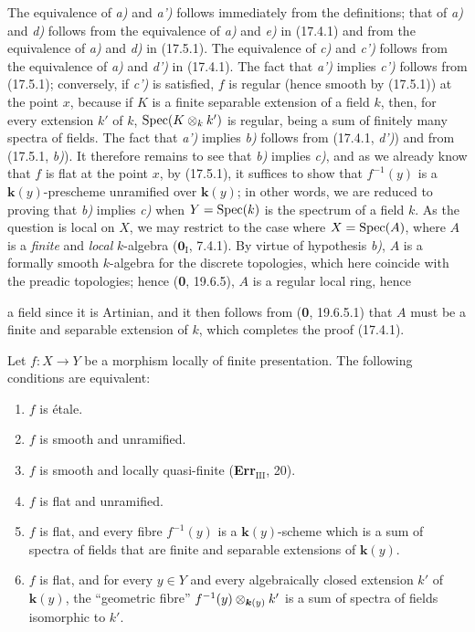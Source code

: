 The equivalence of \emph{a)} and \emph{a')} follows immediately from the definitions; that of \emph{a)} and \emph{d)} follows from the equivalence of \emph{a)} and \emph{e)} in (17.4.1) and from the equivalence of \emph{a)} and \emph{d)} in (17.5.1). The equivalence of \emph{c)} and \emph{c')} follows from the equivalence of \emph{a)} and \emph{d')} in (17.4.1). The fact that \emph{a')} implies \emph{c')} follows from (17.5.1); conversely, if \emph{c')} is satisfied, $f$ is regular (hence smooth by (17.5.1)) at the point $x$, because if $K$ is a finite separable extension of a field $k$, then, for every extension $k'$ of $k$, $\operatorname{Spec}(K\otimes_k k')$ is regular, being a sum of finitely many spectra of fields. The fact that \emph{a')} implies \emph{b)} follows from (17.4.1, \emph{d')}) and from (17.5.1, \emph{b)}). It therefore remains to see that \emph{b)} implies \emph{c)}, and as we already know that $f$ is flat at the point $x$, by (17.5.1), it suffices to show that $f^{-1}(y)$ is a $\boldsymbol{k}(y)$-prescheme unramified over $\boldsymbol{k}(y)$; in other words, we are reduced to proving that \emph{b)} implies \emph{c)} when $Y=\operatorname{Spec}(k)$ is the spectrum of a field $k$. As the question is local on $X$, we may restrict to the case where $X=\operatorname{Spec}(A)$, where $A$ is a \emph{finite} and \emph{local} $k$-algebra ($\mathbf{0}_{\mathrm I}$, 7.4.1). By virtue of hypothesis \emph{b)}, $A$ is a formally smooth $k$-algebra for the discrete topologies, which here coincide with the preadic topologies; hence (\textbf{0}, 19.6.5), $A$ is a regular local ring, hence

a field since it is Artinian, and it then follows from (\textbf{0}, 19.6.5.1) that $A$ must be a finite and separable extension of $k$, which completes the proof (17.4.1).

\begin{corollary}[17.6.2]
\label{IV.17.6.2}
Let $f:X\to Y$ be a morphism locally of finite presentation. The following conditions are equivalent:
\begin{enumerate}
  \item[\textup{a)}] $f$ is étale.
  \item[\textup{a$'$)}] $f$ is smooth and unramified.
  \item[\textup{b)}] $f$ is smooth and locally quasi-finite \textup{(\textbf{Err}$_{\mathrm{III}}$, 20)}.
  \item[\textup{c)}] $f$ is flat and unramified.
  \item[\textup{c$'$)}] $f$ is flat, and every fibre $f^{-1}(y)$ is a $\boldsymbol{k}(y)$-scheme which is a sum of spectra of fields that are finite and separable extensions of $\boldsymbol{k}(y)$.
  \item[\textup{c$''$)}] $f$ is flat, and for every $y\in Y$ and every algebraically closed extension $k'$ of $\boldsymbol{k}(y)$, the ``geometric fibre'' $f^{-1}(y)\otimes_{\boldsymbol{k}(y)}k'$ is a sum of spectra of fields isomorphic to $k'$.
\end{enumerate}
\end{corollary}


